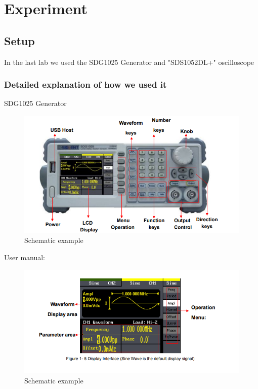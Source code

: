 \section{Experiment}
\subsection{Setup}

In the last lab we used the SDG1025 Generator and "SDS1052DL+" oscilloscope
\subsubsection*{Detailed explanation of how we used it}
SDG1025 Generator
\begin{figure}[H]
	\centering
	\includegraphics[width=12cm]{images/11.png}
	\caption{Schematic example}
	\label{fig:wow1}
\end{figure}

User manual:
\begin{figure}[H]
	\centering
	\includegraphics[width=12cm]{images/12.png}
	\caption{Schematic example}
	\label{fig:wow2}
\end{figure}

